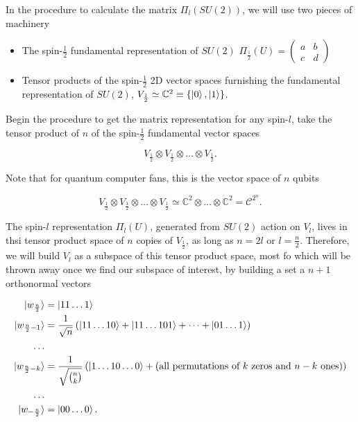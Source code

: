 \noindent In the procedure to calculate the matrix $\Pi_l (SU(2))$, we will use two pieces of machinery

\begin{itemize}
\item The spin-$\frac{1}{2}$ fundamental representation of $SU(2)$
	\subitem $\Pi_{\frac{1}{2}} (U) = \left(\begin{array}{cc} a & b \\ c & d \end{array}\right)$
\item Tensor products of the spin-$\frac{1}{2}$ 2D vector spaces furnishing the fundamental representation of $SU(2)$, $V_{\frac{1}{2}} \simeq \mathbb{C}^2 \equiv \{ \ket{0}, \ket{1} \}$.
\end{itemize}

\noindent Begin the procedure to get the matrix representation for any spin-$l$, take the tensor product of $n$ of the spin-${\frac{1}{2}}$ fundamental vector spaces 

\begin{equation}
V_{\frac{1}{2}} \otimes V_{\frac{1}{2}} \otimes \dots \otimes V_{\frac{1}{2}}.
\end{equation}

\noindent Note that for quantum computer fans, this is the vector space of $n$ qubits

\begin{equation}
V_{\frac{1}{2}} \otimes V_{\frac{1}{2}} \otimes \dots \otimes V_{\frac{1}{2}} \simeq \mathbb{C}^2 \otimes \dots \otimes \mathbb{C}^2 = \mathcal{C}^{2^n}.
\end{equation}

\noindent The spin-$l$ representation $\Pi_l(U)$, generated from $SU(2)$ action on $V_l$, lives in thsi tensor product space of $n$ copies of $V_{\frac{1}{2}}$, as long as $n=2l$ or $l=\frac{n}{2}$. Therefore, we will build $V_l$ as a subspace of this tensor product space, most fo which will be thrown away once we find our subspace of interest, by building a set a $n+1$ orthonormal vectors

\begin{align}
\ket{w_{\frac{n}{2}}} &= \ket{1 1 \dots 1} \\
\ket{w_{\frac{n}{2}-1}} &= \frac{1}{\sqrt{n}} \left( \ket{1 1 \dots 1 0} + \ket{1 1 \dots 1 0 1} + \dots + \ket{0 1 \dots 1} \right) \\
\dots& \\
\ket{w_{\frac{n}{2}-k}} &= \frac{1}{\sqrt{n \choose k}} \left( \ket{ 1 \dots 1 0 \dots 0} + \text{(all permutations of $k$ zeros and $n-k$ ones)} \right) \\
\dots& \\
\ket{w_{-\frac{n}{2}}} &= \ket{ 0 0 \dots 0}.
\end{align}

